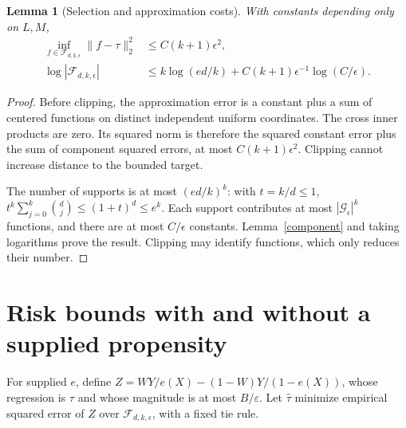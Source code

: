 \documentclass[11pt]{article}
\newtheorem{lemma}[theorem]{Lemma}
\theoremstyle{remark}
\begin{document}
\begin{lemma}[Selection and approximation costs]\label{addnet}
With constants depending only on $L,M$,
\begin{align*}
 \inf_{f\in\mathcal F_{d,k,\epsilon}}\|f-\tau\|_2^2
                           &\leq C(k+1)\epsilon^2,\\
 \log|\mathcal F_{d,k,\epsilon}|
 &\leq k\log(ed/k)+C(k+1)\epsilon^{-1}\log(C/\epsilon).
\end{align*}
\end{lemma}
\begin{proof}
Before clipping, the approximation error is a constant plus a sum of centered functions on distinct independent uniform coordinates. The cross inner products are zero. Its squared norm is therefore the squared constant error plus the sum of component squared errors, at most $C(k+1)\epsilon^2$. Clipping cannot increase distance to the bounded target.

The number of supports is at most $(ed/k)^k$: with $t=k/d\leq1$,
$t^k\sum_{j=0}^k\binom dj\leq(1+t)^d\leq e^k$. Each support contributes at most $|\mathcal G_\epsilon|^k$ functions, and there are at most $C/\epsilon$ constants. Lemma~\ref{component} and taking logarithms prove the result. Clipping may identify functions, which only reduces their number.
\end{proof}

\section{Risk bounds with and without a supplied propensity}
For supplied $e$, define $Z=WY/e(X)-(1-W)Y/(1-e(X))$, whose regression is $\tau$ and whose magnitude is at most $B/\varepsilon$. Let $\widehat\tau$ minimize empirical squared error of $Z$ over $\mathcal F_{d,k,\epsilon}$, with a fixed tie rule.
\end{document}
